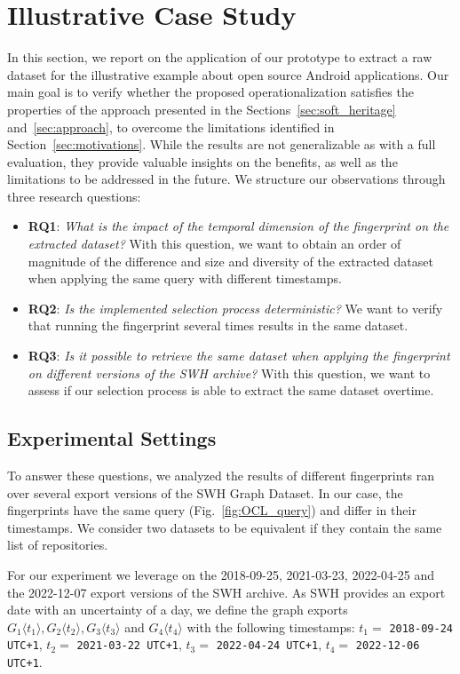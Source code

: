 \section{Illustrative Case Study}
\label{sec:case_study}
In this section, we report on the application of our prototype to extract a raw dataset for the illustrative example about open source Android applications.
Our main goal is to verify whether the proposed operationalization satisfies the properties of the approach presented in the Sections~\ref{sec:soft_heritage} and~\ref{sec:approach}, to overcome the limitations identified in Section~\ref{sec:motivations}. 
While the results are not generalizable as with a full evaluation, they provide valuable insights on the benefits, as well as the limitations to be addressed in the future.
We structure our observations through three research questions: 
\begin{itemize}
    \item \textbf{RQ1}: \textit{What is the impact of the temporal dimension of the fingerprint on the extracted dataset?} With this question, we want to obtain an order of magnitude of the difference and size and diversity of the extracted dataset when applying the same query with different timestamps. 
   
    \item \textbf{RQ2}: \textit{Is the implemented selection process deterministic?}  We want to verify that running the fingerprint several times results in the same dataset.

    \item \textbf{RQ3}: \textit{Is it possible to retrieve the same dataset when applying the fingerprint on different versions of the SWH archive?} With this question, we want to assess if our selection process is able to extract the same dataset overtime.
\end{itemize}


\subsection{Experimental Settings}

To answer these questions, we analyzed the results of different fingerprints ran over several export versions of the SWH Graph Dataset. 
In our case, the fingerprints have the same query (Fig.~\ref{fig:OCL_query}) and differ in their timestamps.
We consider two datasets to be equivalent if they contain the same list of repositories.

For our experiment we leverage on the 2018-09-25, 2021-03-23, 2022-04-25 and the 2022-12-07 export versions of the SWH archive. 
As SWH provides an export date with an uncertainty of a day, we define the graph exports $G_1\langle t_1\rangle, G_2\langle t_2\rangle, G_3\langle t_3\rangle$ and $G_4\langle t_4\rangle$ with the following timestamps: $t_1=$ \texttt{2018-09-24 UTC+1}, $t_2=$ \texttt{2021-03-22 UTC+1}, $t_3=$ \texttt{2022-04-24 UTC+1}, $t_4=$ \texttt{2022-12-06 UTC+1}.

